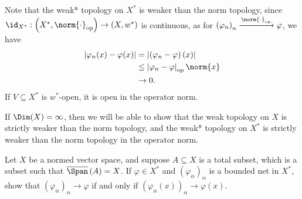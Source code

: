 \documentclass[10pt]{mypackage}
\begin{document}
\begin{example}
  Note that the weak* topology on $X^{\ast}$ is weaker than the norm topology, since $\id_{X^{\ast}}: \left(X^{\ast},\norm{\cdot}_{\text{op}}\right)\rightarrow \left(X,w^{\ast}\right)$ is continuous, as for $\left(\varphi_{n}\right)_n\xrightarrow{\norm{\cdot}_{\text{op}}}\varphi$, we have
  \begin{align*}
    \left\vert \varphi_{n}(x) - \varphi(x) \right\vert &= \left\vert \left(\varphi_{n}-\varphi\right)(x) \right\vert\\
                                                       &\leq \left\vert \varphi_{n} - \varphi \right\vert_{\text{op}}\norm{x}\\
                                                       &\rightarrow 0.
  \end{align*}
  If $V\subseteq X^{\ast}$ is $w^{\ast}$-open, it is open in the operator norm.
\end{example}
\begin{remark}
  If $\Dim(X) = \infty$, then we will be able to show that the weak topology on $X$ is strictly weaker than the norm topology, and the weak* topology on $X^{\ast}$ is strictly weaker than the norm topology in the operator norm.
\end{remark}
\begin{exercise}
  Let $X$ be a normed vector space, and suppose $A\subseteq X$ is a total subset, which is a subset such that $\overline{\Span}\left(A\right) = X$. If $\varphi\in X^{\ast}$ and $\left(\varphi_{\alpha}\right)_{\alpha}$ is a bounded net in $X^{\ast}$, show that $\left(\varphi_{\alpha}\right)_{\alpha}\rightarrow \varphi$ if and only if $\left(\varphi_{\alpha}(x)\right)_{\alpha}\rightarrow \varphi\left(x\right)$.
\end{exercise}
\end{document}
